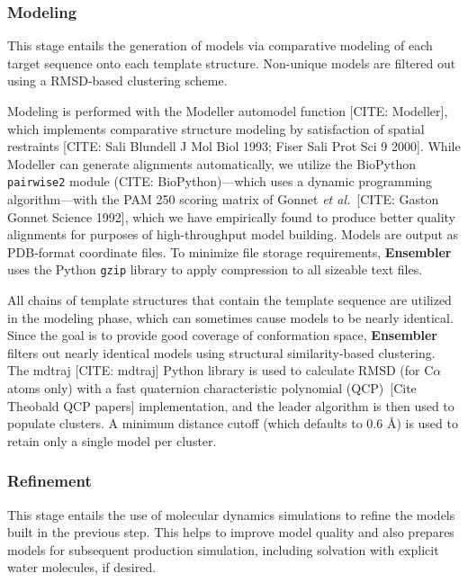 \documentclass[aps,pre,twocolumn,nofootinbib,superscriptaddress,linenumbers]{revtex4-1}
\begin{document}
\subsubsection{Modeling}

This stage entails the generation of models via comparative modeling of each target sequence onto each template structure. Non-unique models are filtered out using a RMSD-based clustering scheme.

Modeling is performed with the Modeller automodel function {\color{red}[CITE: Modeller]}, which implements comparative structure modeling by satisfaction of spatial restraints {\color{red}[CITE: Sali Blundell J Mol Biol 1993; Fiser Sali Prot Sci 9 2000]}.
While Modeller can generate alignments automatically, we utilize the BioPython {\tt pairwise2} module (CITE: BioPython)---which uses a dynamic programming algorithm---with the PAM 250 scoring matrix of Gonnet \textit{et al.}~{\color{red}[CITE: Gaston Gonnet Science 1992]}, which we have empirically found to produce better quality alignments for purposes of high-throughput model building.
Models are output as PDB-format coordinate files.
To minimize file storage requirements, {\bf Ensembler} uses the Python {\tt gzip} library to apply compression to all sizeable text files.

All chains of template structures that contain the template sequence are utilized in the modeling phase, which can sometimes cause models to be nearly identical.
Since the goal is to provide good coverage of conformation space, {\bf Ensembler} filters out nearly identical models using structural similarity-based clustering.
The mdtraj {\color{red}[CITE: mdtraj]} Python library is used to calculate RMSD (for C$\alpha$ atoms only) with a fast quaternion characteristic polynomial (QCP)~{\color{red}[Cite Theobald QCP papers]} implementation, and the leader algorithm is then used to populate clusters.
A minimum distance cutoff (which defaults to 0.6 \AA) is used to retain only a single model per cluster.

\subsubsection{Refinement}

This stage entails the use of molecular dynamics simulations to refine the models built in the previous step.
This helps to improve model quality and also prepares models for subsequent production simulation, including solvation with explicit water molecules, if desired.
\end{document}
